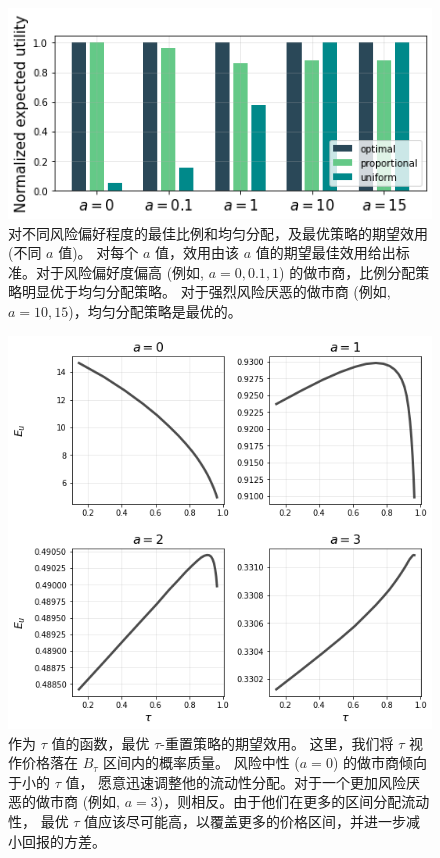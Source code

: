\documentclass[sigconf, dvipsnames]{acmart}
\begin{document}
\begin{figure}
    \centering
    \includegraphics[width=\linewidth]{img/utility_comp.png}
    \caption{ 对不同风险偏好程度的最佳比例和均匀分配，及最优策略的期望效用 (不同 $a$ 值)。
    对每个 $a$ 值，效用由该 $a$ 值的期望最佳效用给出标准。对于风险偏好度偏高 (例如, $a=0,0.1,1$) 的做市商，比例分配策略明显优于均匀分配策略。
    对于强烈风险厌恶的做市商 (例如, $a=10,15$)，均匀分配策略是最优的。
    \label{fig:utility_comp}}
\end{figure}

\begin{figure}
    \centering
    \includegraphics[width=\linewidth]{img/opt_tau.png}
    \caption{ 作为 $\tau$ 值的函数，最优 $\tau$-重置策略的期望效用。
    这里，我们将 $\tau$ 视作价格落在 $B_\tau$ 区间内的概率质量。 风险中性 ($a=0$) 的做市商倾向于小的 $\tau$ 值，
    愿意迅速调整他的流动性分配。对于一个更加风险厌恶的做市商 (例如, $a=3$)，则相反。由于他们在更多的区间分配流动性，
    最优 $\tau$ 值应该尽可能高，以覆盖更多的价格区间，并进一步减小回报的方差。
    \label{fig:opt_tau}}
\end{figure}
\end{document}

